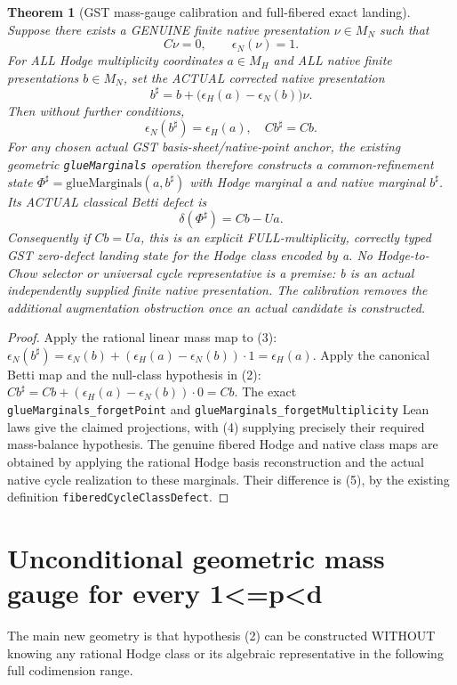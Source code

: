 \documentclass[11pt]{article}
\newtheorem{theorem}{Theorem}
\begin{document}
\begin{theorem}[GST mass-gauge calibration and full-fibered exact landing]
Suppose there exists a GENUINE finite native presentation
\(\nu\in M_N\) such that
\[
 \boxed{C\nu=0,\qquad\epsilon_N(\nu)=1.}           \tag{2}
\]
For ALL Hodge multiplicity coordinates \(a\in M_H\)
and ALL native finite presentations \(b\in M_N\),
set the ACTUAL corrected native presentation
\[
 \boxed{
 b^\sharp=b+\bigl(\epsilon_H(a)-\epsilon_N(b)\bigr)\nu .
 }                                                        \tag{3}
\]
Then without further conditions,
\[
 \boxed{
 \epsilon_N(b^\sharp)=\epsilon_H(a),\quad
 Cb^\sharp=Cb.
 }                                                        \tag{4}
\]
For any chosen actual GST basis-sheet/native-point anchor,
the existing geometric \texttt{glueMarginals} operation
therefore constructs a common-refinement state
\(\Phi^\sharp=\mathrm{glueMarginals}(a,b^\sharp)\)
with Hodge marginal a and native marginal \(b^\sharp\).
Its ACTUAL classical Betti defect is
\[
 \boxed{\delta(\Phi^\sharp)=Cb-Ua.}               \tag{5}
\]
Consequently if \(Cb=Ua\), this is an explicit
FULL-multiplicity, correctly typed GST zero-defect
landing state for the Hodge class encoded by a.
No Hodge-to-Chow selector or universal cycle
representative is a premise: b is an actual
independently supplied finite native presentation.
The calibration removes the additional augmentation
obstruction once an actual candidate is constructed.
\end{theorem}
\begin{proof}
Apply the rational linear mass map to (3):
\(\epsilon_N(b^\sharp)
 =\epsilon_N(b)+(\epsilon_H(a)-\epsilon_N(b))\cdot1
 =\epsilon_H(a)\).
Apply the canonical Betti map and the null-class
hypothesis in (2):
\(Cb^\sharp=Cb+(\epsilon_H(a)-\epsilon_N(b))\cdot0=Cb\).
The exact \texttt{glueMarginals_forgetPoint} and
\texttt{glueMarginals_forgetMultiplicity}
Lean laws give the claimed projections,
with (4) supplying precisely their required
mass-balance hypothesis. The genuine fibered Hodge
and native class maps are obtained by applying
the rational Hodge basis reconstruction and the
actual native cycle realization to these marginals.
Their difference is (5), by the existing definition
\texttt{fiberedCycleClassDefect}.
\end{proof}

\section{Unconditional geometric mass gauge for every 1<=p<d}
The main new geometry is that hypothesis (2) can be
constructed WITHOUT knowing any rational Hodge class
or its algebraic representative in the following
full codimension range.
\end{document}
